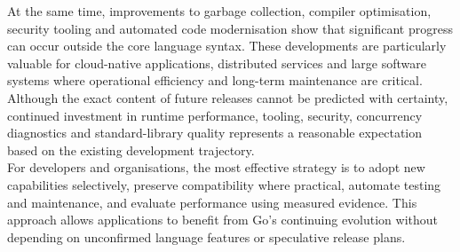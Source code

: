 At the same time, improvements to garbage collection, compiler optimisation, security tooling and automated code modernisation show that significant progress can occur outside the core language syntax. These developments are particularly valuable for cloud-native applications, distributed services and large software systems where operational efficiency and long-term maintenance are critical.\\

Although the exact content of future releases cannot be predicted with certainty, continued investment in runtime performance, tooling, security, concurrency diagnostics and standard-library quality represents a reasonable expectation based on the existing development trajectory.\\

For developers and organisations, the most effective strategy is to adopt new capabilities selectively, preserve compatibility where practical, automate testing and maintenance, and evaluate performance using measured evidence. This approach allows applications to benefit from Go's continuing evolution without depending on unconfirmed language features or speculative release plans.

